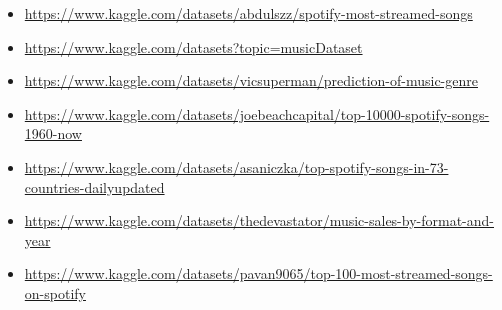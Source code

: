 \documentclass[12pt]{article}
\begin{document}
\begin{itemize}
  \item \href{https://www.kaggle.com/datasets/abdulszz/spotify-most-streamed-songs}{https://www.kaggle.com/datasets/abdulszz/spotify-most-streamed-songs}
  \item \href{https://www.kaggle.com/datasets?topic=musicDataset}{https://www.kaggle.com/datasets?topic=musicDataset}
  \item \href{https://www.kaggle.com/datasets/vicsuperman/prediction-of-music-genre}{https://www.kaggle.com/datasets/vicsuperman/prediction-of-music-genre}
  \item \href{https://www.kaggle.com/datasets/joebeachcapital/top-10000-spotify-songs-1960-now}{https://www.kaggle.com/datasets/joebeachcapital/top-10000-spotify-songs-1960-now}
  \item \href{https://www.kaggle.com/datasets/asaniczka/top-spotify-songs-in-73-countries-dailyupdated}{https://www.kaggle.com/datasets/asaniczka/top-spotify-songs-in-73-countries-dailyupdated}
  \item \href{https://www.kaggle.com/datasets/thedevastator/music-sales-by-format-and-year}{https://www.kaggle.com/datasets/thedevastator/music-sales-by-format-and-year}
  \item \href{https://www.kaggle.com/datasets/pavan9065/top-100-most-streamed-songs-on-spotify}{https://www.kaggle.com/datasets/pavan9065/top-100-most-streamed-songs-on-spotify}
\end{itemize}











\end{document}
